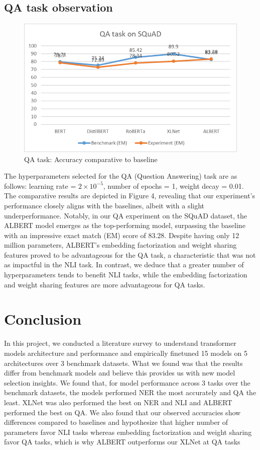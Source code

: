 \documentclass{article}
\begin{document}
\subsection{QA task observation}
\begin{figure}[h]
\centering
\includegraphics[width=0.8\columnwidth]{Picture3.png}
\caption{{QA task: Accuracy comparative to baseline}}
\label{fig:lossimages}
\vspace{-1pt}
\end{figure}
The hyperparameters selected for the QA (Question Answering) task are as follows: learning rate = $2 \times 10^{-5}$, number of epochs = 1, weight decay = 0.01.  The comparative results are depicted in Figure 4, revealing that our experiment's performance closely aligns with the baselines, albeit with a slight underperformance. Notably, in our QA experiment on the SQuAD dataset, the ALBERT model emerges as the top-performing model, surpassing the baseline with an impressive exact match (EM) score of 83.28. Despite having only 12 million parameters, ALBERT's embedding factorization and weight sharing features proved to be advantageous for the QA task, a characteristic that was not as impactful in the NLI task. In contrast, we deduce that a greater number of hyperparameters tends to benefit NLI tasks, while the embedding factorization and weight sharing features are more advantageous for QA tasks.

\section{Conclusion}
In this project, we conducted a literature survey to understand transformer models architecture and performance and empirically finetuned 15 models on 5 architectures over 3 benchmark datasets. What we found was that the results differ from benchmark models and believe this provides us with new model selection insights. We found that, for model performance across 3 tasks over the benchmark datasets, the models performed NER the most accurately and QA the least. XLNet was also performed the best on NER and NLI and ALBERT performed the best on QA. We also found that our observed accuracies show differences compared to baselines and hypothesize that higher number of parameters favor NLI tasks whereas embedding factorization and weight sharing favor QA tasks, which is why ALBERT outperforms our XLNet at QA tasks 
 
\end{document}
